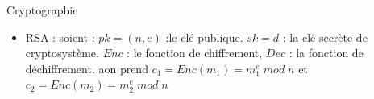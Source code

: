 \documentclass{beamer}
\begin{document}


  \begin{frame}{Cryptographie}

    \begin{itemize}
    \item<1-> {
      RSA :\newline
      soient :\newline
      $pk = (n,e)$ :le clé publique.\newline 
      $sk = d$ : la clé secrète de cryptosystème.\newline
      $Enc$ : le fonction de chiffrement,\newline
      $Dec$ : la fonction de déchiffrement.\newline
      aon prend $c_1 = Enc(m_1) = m_1^e \;mod\;n$ et $c_2 = Enc(m_2) =m_2^e \;mod\;n$ 
              }
    \end{itemize}

  \end{frame}


  
\end{document}
